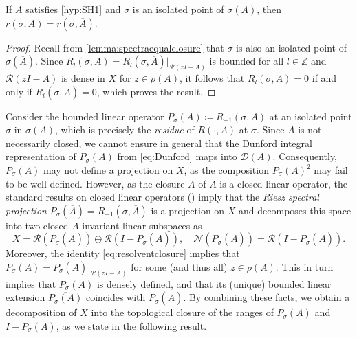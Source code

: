 \documentclass[english]{myarticle}
\begin{document}
\begin{sloppypar}
\begin{lemma} \label{lemma:orderpole}
If $A$ satisfies \ref{hyp:SH1} and $\sigma$ is an isolated point of $\sigma(A)$, then $r(\sigma,A) = r(\sigma,\overline{A})$.    
\end{lemma}
\begin{proof}
Recall from \cref{lemma:spectraequalclosure} that $\sigma$ is also an isolated point of $\sigma(\overline{A})$. Since $R_l(\sigma,A) = R_l(\sigma,\overline{A})|_{\mathcal{R}(zI-A)}$ is bounded for all $l \in \mathbb{Z}$ and $\mathcal{R}(zI-A)$ is dense in $X$ for $z \in \rho(A)$, it follows that $R_l(\sigma,A) = 0$ if and only if $R_l(\sigma,\overline{A}) = 0$, which proves the result. 
\end{proof}

Consider the bounded linear operator $P_{\sigma}(A) \coloneqq R_{-1}(\sigma,A)$ at an isolated point $\sigma$ in $\sigma(A)$, which is precisely the \emph{residue} of $R(\cdot,A)$ at $\sigma$. Since $A$ is not necessarily closed, we cannot ensure in general that the Dunford integral representation of $P_\sigma(A)$ from \eqref{eq:Dunford} maps into $\mathcal{D}(A)$. Consequently, $P_\sigma(A)$ may not define a projection on $X$, as the composition $P_\sigma(A)^2$ may fail to be well-defined. However, as the closure $\overline{A}$ of $A$ is a closed linear operator, the standard results on closed linear operators (\cite[Section XV.2]{Gohberg1990}) imply that the \emph{Riesz spectral projection} $P_\sigma(\overline{A}) = R_{-1}(\sigma, \overline{A})$ is a projection on $X$ and decomposes this space into two closed $\overline{A}$-invariant linear subspaces as
\begin{equation*}
    X = \mathcal{R}(P_\sigma(\overline{A})) \oplus \mathcal{R}(I-P_\sigma(\overline{A})), \quad \mathcal{N}(P_\sigma(\overline{A})) = \mathcal{R}(I-P_\sigma(\overline{A})).
\end{equation*}
Moreover, the identity \eqref{eq:resolventclosure} implies that $P_\sigma(A) = P_\sigma(\overline{A})|_{\mathcal{R}(zI - A)}$ for some (and thus all) $z \in \rho(A)$. This in turn implies that $P_\sigma(A)$ is densely defined, and that its (unique) bounded linear extension $\overline{P_\sigma(A)}$ coincides with $P_\sigma(\overline{A})$. By combining these facts, we obtain a decomposition of $X$ into the topological closure of the ranges of $P_\sigma(A)$ and $I-P_\sigma(A)$, as we state in the following result.


\end{sloppypar}
\end{document}
